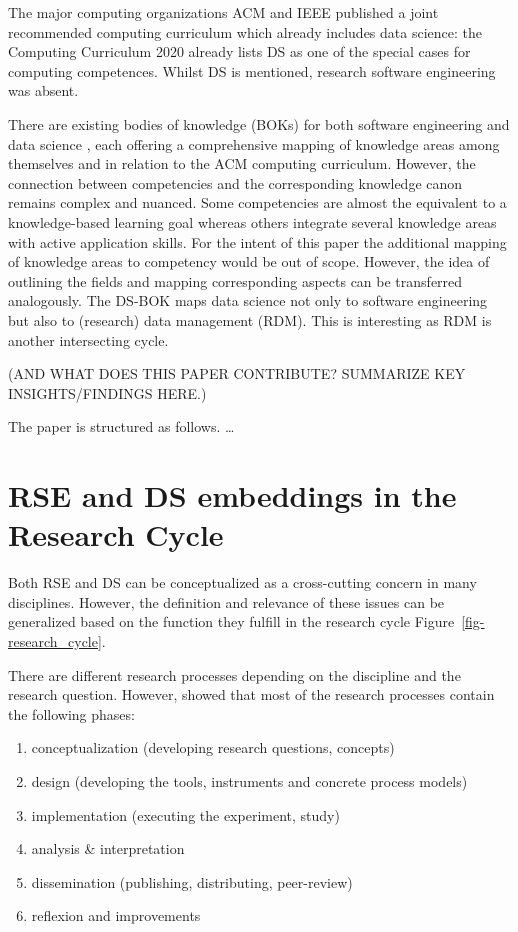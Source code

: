 \documentclass[
        english,biblatex
    ]{lni}
\providecommand{\tightlist}{%
    \setlength{\itemsep}{0pt}\setlength{\parskip}{0pt}}
\begin{document}
    The major computing organizations ACM and IEEE published a joint
    recommended computing curriculum which already includes data
    science: the Computing Curriculum 2020 \autocite{CC2020} already
    lists DS as one of the special cases for computing competences.
    Whilst DS is mentioned, research software engineering was absent.

    There are existing bodies of knowledge (BOKs) for both software
    engineering \autocite{SWEBOK2014} and data science
    \autocite{DSBOK2017}, each offering a comprehensive mapping of
    knowledge areas among themselves and in relation to the ACM
    computing curriculum. However, the connection between competencies
    and the corresponding knowledge canon remains complex and nuanced.
    Some competencies are almost the equivalent to a knowledge-based
    learning goal whereas others integrate several knowledge areas with
    active application skills. For the intent of this paper the
    additional mapping of knowledge areas to competency would be out of
    scope. However, the idea of outlining the fields and mapping
    corresponding aspects can be transferred analogously. The DS-BOK
    maps data science not only to software engineering but also to
    (research) data management (RDM). This is interesting as RDM is
    another intersecting cycle.

    (AND WHAT DOES THIS PAPER CONTRIBUTE? SUMMARIZE KEY
    INSIGHTS/FINDINGS HERE.)

    The paper is structured as follows. \ldots{}

    \section{RSE and DS embeddings in the Research
    Cycle}\label{rse-and-ds-embeddings-in-the-research-cycle}

    Both RSE and DS can be conceptualized as a cross-cutting concern in
    many disciplines. However, the definition and relevance of these
    issues can be generalized based on the function they fulfill in the
    research cycle Figure~\ref{fig-research_cycle}.

    There are different research processes depending on the discipline
    and the research question. However, \autocite{Dehne2021} showed that
    most of the research processes contain the following phases:

    \begin{enumerate}
    \def\labelenumi{\arabic{enumi}.}
    \tightlist
    \item
      conceptualization (developing research questions, concepts)
    \item
      design (developing the tools, instruments and concrete process
      models)
    \item
      implementation (executing the experiment, study)
    \item
      analysis \& interpretation
    \item
      dissemination (publishing, distributing, peer-review)
    \item
      reflexion and improvements
    \end{enumerate}
\end{document}
